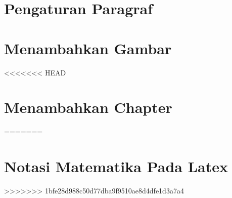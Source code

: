 \documentclass{wileySix}
\begin{document}
\chapter{Pengaturan Paragraf}


\chapter{Menambahkan Gambar}


<<<<<<< HEAD
\chapter{Menambahkan Chapter}


=======
\chapter{Notasi Matematika Pada Latex}

>>>>>>> 1bfe28d988c50d77dba9f9510ae8d4dfe1d3a7a4


 



\printindex
\end{document}
